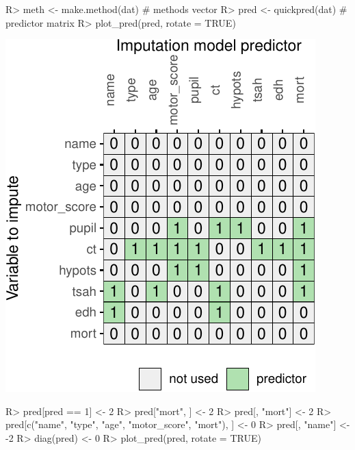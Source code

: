\documentclass[
]{jss}
\begin{document}
\begin{CodeChunk}
\begin{CodeInput}
R> meth <- make.method(dat) # methods vector
R> pred <- quickpred(dat)   # predictor matrix
R> plot_pred(pred, rotate = TRUE)
\end{CodeInput}


\begin{center}\includegraphics{Imputation_of_Incomplete_Multilevel_Data_files/figure-latex/impact-1} \end{center}

\begin{CodeInput}
R> pred[pred == 1] <- 2
R> pred["mort", ] <- 2
R> pred[, "mort"] <- 2
R> pred[c("name", "type", "age", "motor_score", "mort"), ] <- 0
R> pred[, "name"] <- -2
R> diag(pred) <- 0
R> plot_pred(pred, rotate = TRUE)
\end{CodeInput}



\end{CodeChunk}
\end{document}
